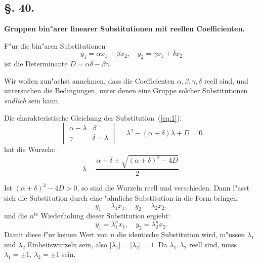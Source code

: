 \documentclass[12pt,a4paper]{article}
\theoremstyle{weber}
\begin{document}
\bigskip

\subsection*{\S. 40.}

\begin{center}
\textbf{Gruppen bin"arer linearer Substitutionen mit reellen Coefficienten.}
\end{center}

\bigskip

F"ur die bin"aren Substitutionen
\begin{equation}\label{eq:1}
y_1 = \alpha x_1 + \beta x_2,\quad y_2 = \gamma x_1 + \delta x_2
\end{equation}
ist die Determinante $D = \alpha\delta - \beta\gamma$.

Wir wollen zun"achst annehmen, dass die Coefficienten $\alpha, \beta, \gamma, \delta$ reell sind, und untersuchen die Bedingungen, unter denen eine Gruppe solcher Substitutionen \textit{endlich} sein kann.

Die charakteristische Gleichung der Substitution~(\ref{eq:1}):
\begin{equation}\label{eq:2}
\begin{vmatrix} \alpha - \lambda & \beta \\ \gamma & \delta - \lambda \end{vmatrix}
= \lambda^2 - (\alpha+\delta)\lambda + D = 0
\end{equation}
hat die Wurzeln:
\begin{equation}\label{eq:3}
\lambda = \frac{\alpha+\delta \pm \sqrt{(\alpha+\delta)^2 - 4D}}{2}.
\end{equation}

Ist $(\alpha+\delta)^2 - 4D > 0$, so sind die Wurzeln reell und verschieden. Dann l"asst sich die Substitution durch eine "ahnliche Substitution in die Form bringen:
\begin{equation}\label{eq:4}
y_1 = \lambda_1 x_1,\quad y_2 = \lambda_2 x_2,
\end{equation}
und die $n^{\text{te}}$ Wiederholung dieser Substitution ergiebt:
\[
y_1 = \lambda_1^n x_1,\quad y_2 = \lambda_2^n x_2.
\]
Damit diese f"ur keinen Wert von $n$ die identische Substitution wird, m"ussen $\lambda_1$ und $\lambda_2$ Einheitswurzeln sein, also $|\lambda_1| = |\lambda_2| = 1$. Da $\lambda_1, \lambda_2$ reell sind, muss $\lambda_1 = \pm 1$, $\lambda_2 = \pm 1$ sein.
\end{document}

